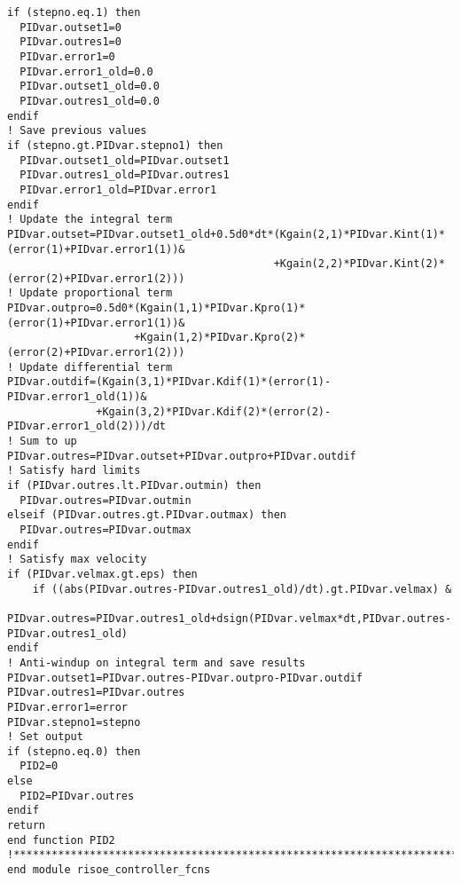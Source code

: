 {\begin{verbatim}
if (stepno.eq.1) then
  PIDvar.outset1=0
  PIDvar.outres1=0
  PIDvar.error1=0
  PIDvar.error1_old=0.0
  PIDvar.outset1_old=0.0
  PIDvar.outres1_old=0.0
endif
! Save previous values
if (stepno.gt.PIDvar.stepno1) then
  PIDvar.outset1_old=PIDvar.outset1
  PIDvar.outres1_old=PIDvar.outres1
  PIDvar.error1_old=PIDvar.error1
endif
! Update the integral term
PIDvar.outset=PIDvar.outset1_old+0.5d0*dt*(Kgain(2,1)*PIDvar.Kint(1)*(error(1)+PIDvar.error1(1))&
                                          +Kgain(2,2)*PIDvar.Kint(2)*(error(2)+PIDvar.error1(2)))
! Update proportional term
PIDvar.outpro=0.5d0*(Kgain(1,1)*PIDvar.Kpro(1)*(error(1)+PIDvar.error1(1))&
                    +Kgain(1,2)*PIDvar.Kpro(2)*(error(2)+PIDvar.error1(2)))
! Update differential term
PIDvar.outdif=(Kgain(3,1)*PIDvar.Kdif(1)*(error(1)-PIDvar.error1_old(1))&
              +Kgain(3,2)*PIDvar.Kdif(2)*(error(2)-PIDvar.error1_old(2)))/dt
! Sum to up
PIDvar.outres=PIDvar.outset+PIDvar.outpro+PIDvar.outdif
! Satisfy hard limits
if (PIDvar.outres.lt.PIDvar.outmin) then
  PIDvar.outres=PIDvar.outmin
elseif (PIDvar.outres.gt.PIDvar.outmax) then
  PIDvar.outres=PIDvar.outmax
endif
! Satisfy max velocity
if (PIDvar.velmax.gt.eps) then
    if ((abs(PIDvar.outres-PIDvar.outres1_old)/dt).gt.PIDvar.velmax) &
      PIDvar.outres=PIDvar.outres1_old+dsign(PIDvar.velmax*dt,PIDvar.outres-PIDvar.outres1_old)
endif
! Anti-windup on integral term and save results
PIDvar.outset1=PIDvar.outres-PIDvar.outpro-PIDvar.outdif
PIDvar.outres1=PIDvar.outres
PIDvar.error1=error
PIDvar.stepno1=stepno
! Set output
if (stepno.eq.0) then
  PID2=0
else
  PID2=PIDvar.outres
endif
return
end function PID2
!**************************************************************************************************
end module risoe_controller_fcns
\end{verbatim}
}
